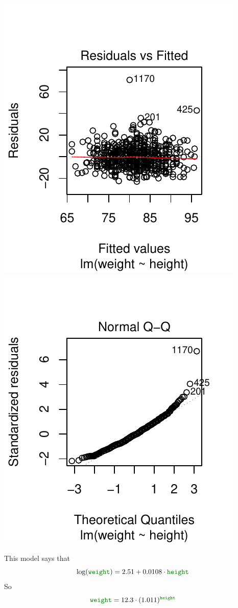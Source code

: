 \documentclass[twoside]{book}\usepackage[]{graphicx}\usepackage[]{xcolor}
\makeatletter
\def\maxwidth{ %
  \ifdim\Gin@nat@width>\linewidth
    \linewidth
  \else
    \Gin@nat@width
  \fi
}
\newenvironment{knitrout}{}{} %
\newcommand{\variable}[1]{{\color{green!50!black}\texttt{#1}}}
\makeatother
\begin{document}
\begin{solution}
\begin{enumerate}
\begin{knitrout}
{\centering \includegraphics[width=\maxwidth]{figures/fig-unnamed-chunk-195-1} 
\includegraphics[width=\maxwidth]{figures/fig-unnamed-chunk-195-2} 

}



\end{knitrout}
This model says that
\[
\log( \variable{weight} ) 
	= 2.51 + 0.0108 \cdot \variable{height}
\]
So
\[
\variable{weight}  
= 12.3 
		\cdot (1.011)^{\variable{height}}
\]
\end{enumerate}
\end{solution}
\end{document}
